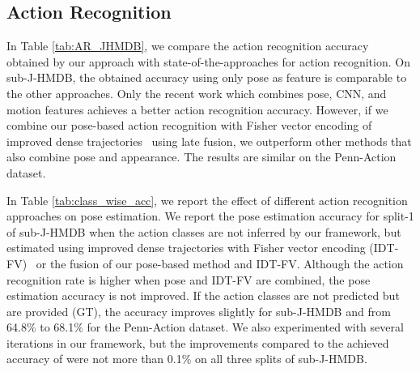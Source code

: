 \documentclass[a4paper, 10pt, conference]{ieeeconf}      \usepackage{FG2017}
\begin{document}
\begin{table*}[t]
		\footnotesize 
		\begin{center}
			\setlength{\tabcolsep}{1pt}
			\def\arraystretch{1}
			\end{center}
			\vspace{-3mm}
			\caption{Analysis of pose estimation accuracy with respect to action recognition accuracy. The values in the parentheses are the corresponding action recognition accuracies. (APK threshold: 0.1) 
		}
		\captionsetup[figure]{skip=pt}
		\label{tab:class_wise_acc}
\end{table*}

\subsection{Action Recognition} In Table \ref{tab:AR_JHMDB}, we compare the action recognition accuracy obtained by our approach with state-of-the-approaches for action recognition. On sub-J-HMDB, the obtained accuracy using only pose as feature is comparable to the other approaches. Only the recent work \cite{cheron2015p} which combines pose, CNN, and motion features achieves a better action recognition accuracy. However, if we combine our pose-based action recognition with Fisher vector encoding of improved dense trajectories~\cite{wang2013action} using late fusion, we outperform other methods that also combine pose and appearance. The results are similar on the Penn-Action dataset.



In Table \ref{tab:class_wise_acc}, we report the effect of different action recognition approaches on pose estimation. We report the pose estimation accuracy for split-1 of sub-J-HMDB when the action classes are not inferred by our framework, but estimated using improved dense trajectories with Fisher vector encoding (IDT-FV)~\cite{wang2013action} or the fusion of our pose-based method and IDT-FV. Although the action recognition rate is higher when pose and IDT-FV are combined, the pose estimation accuracy is not improved. If the action classes are not predicted but are provided (GT),
the accuracy improves slightly for sub-J-HMDB and
from 64.8\% to 68.1\% for the Penn-Action dataset. We also experimented with several iterations in our framework, but the improvements compared to the achieved accuracy of  were not more than 0.1\% on all three splits of sub-J-HMDB.  
\end{document}
